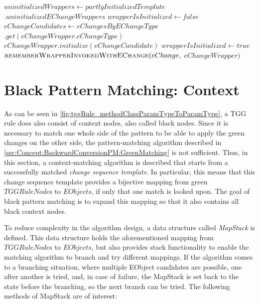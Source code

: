 \begin{algorithm}
\begin{algorithmic}
            \State $uninitializedWrappers \gets partlyInitializedTemplate$
            \State \hspace{5.2cm} $.uninitializedEChangeWrappers$
                \State $wrapperIsInitialized \gets false$
                \State $eChangeCandidates \gets eChangesByEChangeType$
                \State \hspace{5.2cm} $.get(eChangeWrapper.eChangeType)$
                        \State $eChangeWrapper.initialize(eChangeCandidate)$
                        \State $wrapperIsInitialized \gets true$
                        \State $\Call{rememberWrapperInvokedWithEChange}{}(eChange,$
                        \State \hspace{5.2cm} $eChangeWrapper)$
                    \EndIf
                \EndFor
                    \State {}
                \EndIf
            \EndFor
            \State {}
        \EndFunction
    \end{algorithmic}    
\end{algorithm}


\section{Black Pattern Matching: Context}
\label{sec:Concept:BackwardConversionPM:BlackMatching}
As can be seen in \autoref{fig:tggRule_methodClassParamTypeToParamType}, a TGG rule does also consist of context nodes, also called black nodes.
Since it is necessary to match one whole side of the pattern to be able to apply the green changes on the other side, the pattern-matching algorithm described in \autoref{sec:Concept:BackwardConversionPM:GreenMatching} is not sufficient.
Thus, in this section, a context-matching algorithm is described that starts from a successfully matched \emph{change sequence template}.
In particular, this means that this change sequence template provides a bijective mapping from green $TGGRuleNode$s to $EObjects$, if only that one match is looked upon.
The goal of black pattern matching is to expand this mapping so that it also contains all black context nodes.

To reduce complexity in the algorithm design, a data structure called \emph{MapStack} is defined. This data structure holds the aforementioned mapping from $TGGRuleNode$s to $EObjects$, but also provides stack functionality to enable the matching algorithm to branch and try different mappings.
If the algorithm comes to a branching situation, where multiple EObject candidates are possible, one after another is tried, and, in case of failure, the MapStack is set back to the state before the branching, so the next branch can be tried. The following methods of MapStack are of interest:

